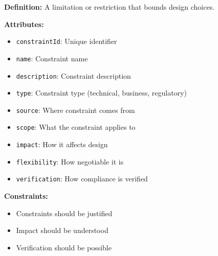 \documentclass[11pt,letterpaper]{article}
\begin{document}
\begin{definitionbox}
\textbf{Definition:} A limitation or restriction that bounds design choices.

\textbf{Attributes:}
\begin{itemize}[nosep]
    \item \texttt{constraintId}: Unique identifier
    \item \texttt{name}: Constraint name
    \item \texttt{description}: Constraint description
    \item \texttt{type}: Constraint type (technical, business, regulatory)
    \item \texttt{source}: Where constraint comes from
    \item \texttt{scope}: What the constraint applies to
    \item \texttt{impact}: How it affects design
    \item \texttt{flexibility}: How negotiable it is
    \item \texttt{verification}: How compliance is verified
\end{itemize}

\textbf{Constraints:}
\begin{itemize}[nosep]
    \item Constraints should be justified
    \item Impact should be understood
    \item Verification should be possible
\end{itemize}
\end{definitionbox}
\end{document}
